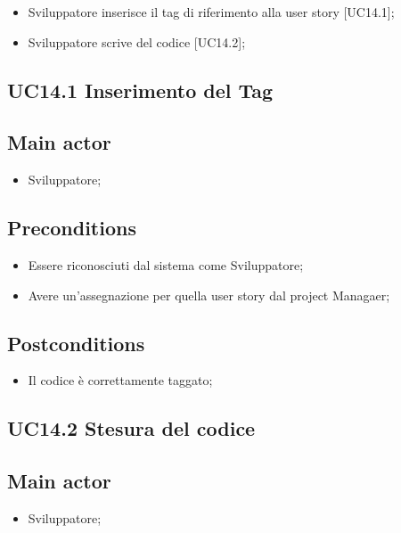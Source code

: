 \documentclass{article}
\begin{document}
        \begin{itemize}
            \item Sviluppatore inserisce il tag di riferimento alla user story [UC14.1];
            \item Sviluppatore scrive del codice [UC14.2];
        \end{itemize}

        \subsection{UC14.1 Inserimento del Tag}
\subsection*{Main actor}
        \begin{itemize}
            \item Sviluppatore;
        \end{itemize}
    
    \subsection*{Preconditions}
        \begin{itemize}
            \item Essere riconosciuti dal sistema come Sviluppatore;
            \item Avere un'assegnazione per quella user story dal project Managaer;
        \end{itemize}
        
    \subsection*{Postconditions} 
        \begin{itemize}
            \item Il codice è correttamente taggato;  
        \end{itemize}

        
        \subsection{UC14.2 Stesura del codice}
\subsection*{Main actor}
        \begin{itemize}
            \item Sviluppatore;
        \end{itemize}
    
\end{document}
